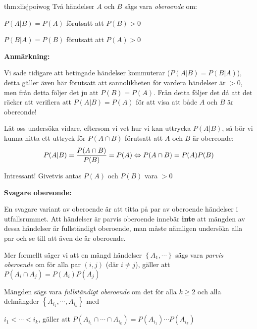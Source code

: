 \par\bigskip
\begin{theo}{thm:disjpoiwog}
  Två händelser $A$ och $B$ sägs vara \textit{oberoende} om:\par
  $P(A|B) = P(A)$ förutsatt att $P(B)>0$\par
  $P(B|A)=P(B)$ förutsatt att $P(A)>0$
\end{theo}
\par\bigskip
\noindent\textbf{Anmärkning:}\par
\noindent Vi sade tidigare att betingade händelser kommuterar ($P(A|B)=P(B|A)$), detta gäller även här förutsatt att sannolikheten för vardera händelser är $>0$, men från detta följer det ju att $P(B)=P(A)$. Från detta följer det då att det räcker att verifiera att $P(A|B)=P(A)$ för att visa att både $A$ och $B$ är obereonde!
\par\bigskip
\noindent Låt oss undersöka vidare, eftersom vi vet hur vi kan uttrycka $P(A|B)$, så bör vi kunna hitta ett uttryck för $P(A\cap B)$ förutsatt att $A$ och $B$ är obereonde:
\begin{equation*}
  \begin{gathered}
    P(A|B) = \dfrac{P(A\cap B)}{P(B)} = P(A) \Leftrightarrow P(A\cap B) = P(A)P(B)
  \end{gathered}
\end{equation*}
\par\bigskip
\noindent Intressant! Givetvis antas $P(A)$ och $P(B)$ vara $>0$
\par\bigskip
\noindent\textbf{Svagare obereonde:}\par
\noindent En svagare variant av oberoende är att titta på par av oberoende händelser i utfallsrummet. Att händelser är parvis oberoende innebär \textbf{inte} att mängden av dessa händelser är fullständigt oberoende, man måste nämligen undersöka alla par och se till att även de är oberoende.\par\bigskip
\noindent Mer formellt säger vi att en mängd händelser $\left\{A_1,\cdots\right\}$ sägs vara \textit{parvis oberoende} om för alla par $(i,j)$ (där $i\neq j $), gäller att $P(A_i\cap A_j)=P(A_i)P(A_j)$\par
\noindent Mängden sägs vara \textit{fullständigt oberoende} om det för alla $k\geq2$ och alla delmängder $\left\{A_{i_1},\cdots, A_{i_k}\right\}$ med\par\noindent $i_1<\cdots<i_k$, gäller att $P(A_{i_1}\cap\cdots\cap A_{i_k}) = P(A_{i_1})\cdots P(A_{i_k})$
\par\bigskip
